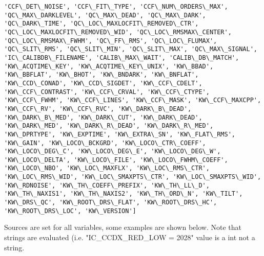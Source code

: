 \documentclass[11pt]{article}
\begin{document}
\begin{Verbatim}[commandchars=\\\{\}]
'CCF\_DET\_NOISE', 'CCF\_FIT\_TYPE', 'CCF\_NUM\_ORDERS\_MAX', 'QC\_MAX\_DARKLEVEL', 'QC\_MAX\_DEAD', 'QC\_MAX\_DARK', 'QC\_DARK\_TIME', 'QC\_LOC\_MAXLOCFIT\_REMOVED\_CTR', 'QC\_LOC\_MAXLOCFIT\_REMOVED\_WID', 'QC\_LOC\_RMSMAX\_CENTER', 'QC\_LOC\_RMSMAX\_FWHM', 'QC\_FF\_RMS', 'QC\_LOC\_FLUMAX', 'QC\_SLIT\_RMS', 'QC\_SLIT\_MIN', 'QC\_SLIT\_MAX', 'QC\_MAX\_SIGNAL', 'IC\_CALIBDB\_FILENAME', 'CALIB\_MAX\_WAIT', 'CALIB\_DB\_MATCH', 'KW\_ACQTIME\_KEY', 'KW\_ACQTIME\_KEY\_UNIX', 'KW\_BBAD', 'KW\_BBFLAT', 'KW\_BHOT', 'KW\_BNDARK', 'KW\_BNFLAT', 'KW\_CCD\_CONAD', 'KW\_CCD\_SIGDET', 'KW\_CCF\_CDELT', 'KW\_CCF\_CONTRAST', 'KW\_CCF\_CRVAL', 'KW\_CCF\_CTYPE', 'KW\_CCF\_FWHM', 'KW\_CCF\_LINES', 'KW\_CCF\_MASK', 'KW\_CCF\_MAXCPP', 'KW\_CCF\_RV', 'KW\_CCF\_RVC', 'KW\_DARK\_B\_DEAD', 'KW\_DARK\_B\_MED', 'KW\_DARK\_CUT', 'KW\_DARK\_DEAD', 'KW\_DARK\_MED', 'KW\_DARK\_R\_DEAD', 'KW\_DARK\_R\_MED', 'KW\_DPRTYPE', 'KW\_EXPTIME', 'KW\_EXTRA\_SN', 'KW\_FLAT\_RMS', 'KW\_GAIN', 'KW\_LOCO\_BCKGRD', 'KW\_LOCO\_CTR\_COEFF', 'KW\_LOCO\_DEG\_C', 'KW\_LOCO\_DEG\_E', 'KW\_LOCO\_DEG\_W', 'KW\_LOCO\_DELTA', 'KW\_LOCO\_FILE', 'KW\_LOCO\_FWHM\_COEFF', 'KW\_LOCO\_NBO', 'KW\_LOC\_MAXFLX', 'KW\_LOC\_RMS\_CTR', 'KW\_LOC\_RMS\_WID', 'KW\_LOC\_SMAXPTS\_CTR', 'KW\_LOC\_SMAXPTS\_WID', 'KW\_RDNOISE', 'KW\_TH\_COEFF\_PREFIX', 'KW\_TH\_LL\_D', 'KW\_TH\_NAXIS1', 'KW\_TH\_NAXIS2', 'KW\_TH\_ORD\_N', 'KW\_TILT', 'KW\_DRS\_QC', 'KW\_ROOT\_DRS\_FLAT', 'KW\_ROOT\_DRS\_HC', 'KW\_ROOT\_DRS\_LOC', 'KW\_VERSION']

    \end{Verbatim}

    Sources are set for all variables, some examples are shown below. Note
that strings are evaluated (i.e. "IC\_CCDX\_RED\_LOW = 2028" value is a
int not a string.
\end{document}
